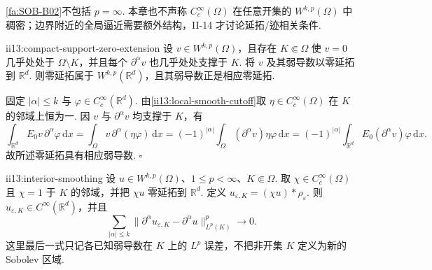 \begin{FAWarning}[全空间光滑紧支撑密度的指数与区域边界]
\autoref{fa:SOB-B02}不包括 \(\displaystyle p=\infty\). 本章也不声称 \(\displaystyle C_c^\infty(\Omega)\) 在任意开集的 \(\displaystyle W^{k,p}(\Omega)\) 中稠密；边界附近的全局逼近需要额外结构，II-14 才讨论延拓/迹相关条件.
\end{FAWarning}

\begin{FALemma}{ii13:compact-support-zero-extension}
设 \(\displaystyle v\in W^{k,p}(\Omega)\)，且存在 \(\displaystyle K\Subset\Omega\) 使 \(\displaystyle v=0\) 几乎处处于 \(\displaystyle\Omega\setminus K\)，并且每个 \(\displaystyle\partial^\alpha v\) 也几乎处处支撑于 \(\displaystyle K\). 将 \(\displaystyle v\) 及其弱导数以零延拓到 \(\displaystyle\mathbb R^d\). 则零延拓属于 \(\displaystyle W^{k,p}(\mathbb R^d)\)，且其弱导数正是相应零延拓.
\end{FALemma}

\begin{FAProof}
固定 \(\displaystyle|\alpha|\leqslant k\) 与 \(\displaystyle\varphi\in C_c^\infty(\mathbb R^d)\). 由\autoref{ii13:local-smooth-cutoff}取 \(\displaystyle\eta\in C_c^\infty(\Omega)\) 在 \(\displaystyle K\) 的邻域上恒为一. 因 \(\displaystyle v\) 与 \(\displaystyle\partial^\alpha v\) 均支撑于 \(\displaystyle K\)，有
\[
\int_{\mathbb R^d}E_0v\,\partial^\alpha\varphi\,\mathrm{d}x
=
\int_\Omega v\,\partial^\alpha(\eta\varphi)\,\mathrm{d}x
=
(-1)^{|\alpha|}
\int_\Omega(\partial^\alpha v)\eta\varphi\,\mathrm{d}x
=
(-1)^{|\alpha|}
\int_{\mathbb R^d}E_0(\partial^\alpha v)\varphi\,\mathrm{d}x.
\]
故所述零延拓具有相应弱导数.
\hfill\(\square\)
\end{FAProof}

\begin{FACorollary}[B][任意开集的内部平滑性]{ii13:interior-smoothing}
设 \(\displaystyle u\in W^{k,p}(\Omega)\)、\(\displaystyle1\leqslant p<\infty\)、\(\displaystyle K\Subset\Omega\). 取 \(\displaystyle\chi\in C_c^\infty(\Omega)\) 且 \(\displaystyle\chi=1\) 于 \(\displaystyle K\) 的邻域，并把 \(\displaystyle\chi u\) 零延拓到 \(\displaystyle\mathbb R^d\). 定义 \(\displaystyle u_{\varepsilon,K} = (\chi u)*\rho_\varepsilon.\)
则 \(\displaystyle u_{\varepsilon,K}\in C^\infty(\mathbb R^d)\)，并且
\[
\sum_{|\alpha|\leqslant k}
\|\partial^\alpha u_{\varepsilon,K}-\partial^\alpha u\|_{L^p(K)}^p
\longrightarrow0.
\]
这里最后一式只记各已知弱导数在 \(\displaystyle K\) 上的 \(\displaystyle L^p\) 误差，不把非开集 \(\displaystyle K\) 定义为新的 Sobolev 区域.
\end{FACorollary}


